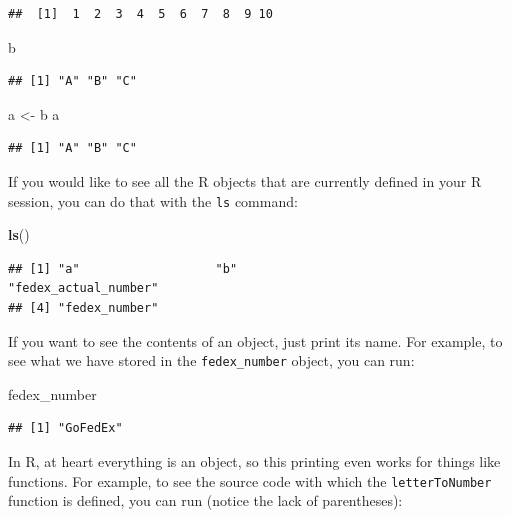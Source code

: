 \documentclass[]{book}
\makeatletter
\newenvironment{Shaded}{\begin{snugshade}}{\end{snugshade}}
\newcommand{\KeywordTok}[1]{\textcolor[rgb]{0.13,0.29,0.53}{\textbf{#1}}}
\newcommand{\StringTok}[1]{\textcolor[rgb]{0.31,0.60,0.02}{#1}}
\newcommand{\NormalTok}[1]{#1}
\newenvironment{kframe}{%
\medskip{}
\setlength{\fboxsep}{.8em}
 \def\at@end@of@kframe{}%
 \ifinner\ifhmode%
  \def\at@end@of@kframe{\end{minipage}}%
  \begin{minipage}{\columnwidth}%
 \fi\fi%
 \def\FrameCommand##1{\hskip\@totalleftmargin \hskip-\fboxsep
 \colorbox{shadecolor}{##1}\hskip-\fboxsep
     \hskip-\linewidth \hskip-\@totalleftmargin \hskip\columnwidth}%
 \MakeFramed {\advance\hsize-\width
   \@totalleftmargin\z@ \linewidth\hsize
   \@setminipage}}%
 {\par\unskip\endMakeFramed%
 \at@end@of@kframe}
\renewenvironment{Shaded}{\begin{kframe}}{\end{kframe}}
\theoremstyle{definition}
\theoremstyle{definition}
\theoremstyle{definition}
\theoremstyle{remark}
\makeatother
\begin{document}
\begin{verbatim}
##  [1]  1  2  3  4  5  6  7  8  9 10
\end{verbatim}

\begin{Shaded}
\begin{Highlighting}[]
\NormalTok{b}
\end{Highlighting}
\end{Shaded}

\begin{verbatim}
## [1] "A" "B" "C"
\end{verbatim}

\begin{Shaded}
\begin{Highlighting}[]
\NormalTok{a <-}\StringTok{ }\NormalTok{b}
\NormalTok{a}
\end{Highlighting}
\end{Shaded}

\begin{verbatim}
## [1] "A" "B" "C"
\end{verbatim}

If you would like to see all the R objects that are currently defined in
your R session, you can do that with the \texttt{ls} command:

\begin{Shaded}
\begin{Highlighting}[]
\KeywordTok{ls}\NormalTok{()}
\end{Highlighting}
\end{Shaded}

\begin{verbatim}
## [1] "a"                   "b"                   "fedex_actual_number"
## [4] "fedex_number"
\end{verbatim}

If you want to see the contents of an object, just print its name. For
example, to see what we have stored in the \texttt{fedex\_number}
object, you can run:

\begin{Shaded}
\begin{Highlighting}[]
\NormalTok{fedex_number}
\end{Highlighting}
\end{Shaded}

\begin{verbatim}
## [1] "GoFedEx"
\end{verbatim}

In R, at heart everything is an object, so this printing even works for
things like functions. For example, to see the source code with which
the \texttt{letterToNumber} function is defined, you can run (notice the
lack of parentheses):
\end{document}
